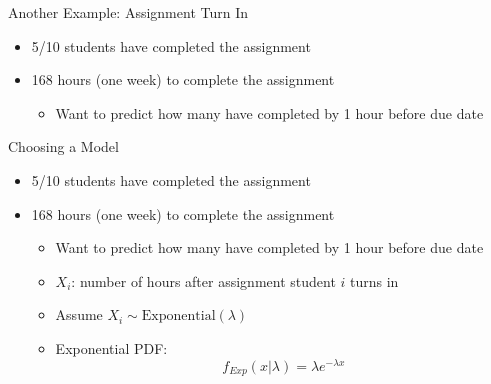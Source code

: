 \documentclass[aspectratio=169]{beamer}
\begin{document}
\begin{frame}{Another Example: Assignment Turn In}

\begin{itemize}
	\item 5/10 students have completed the assignment
	\item 168 hours (one week) to complete the assignment
	\begin{itemize}
	\item Want to predict how many have completed by 1 hour before due date
	\end{itemize}
\end{itemize}

\end{frame}
\begin{frame}{Choosing a Model}

\begin{itemize}
	\item 5/10 students have completed the assignment
	\item 168 hours (one week) to complete the assignment
	\begin{itemize}
	\item Want to predict how many have completed by 1 hour before due date
	\item $X_i$: number of hours after assignment student $i$ turns in
	\item Assume $X_i \sim \textrm{Exponential} (\lambda)$
	\item Exponential PDF:
	$$f_{Exp} (x | \lambda) = \lambda e^{-\lambda x}$$
	\end{itemize}
\end{itemize}
\end{frame}
\end{document}
